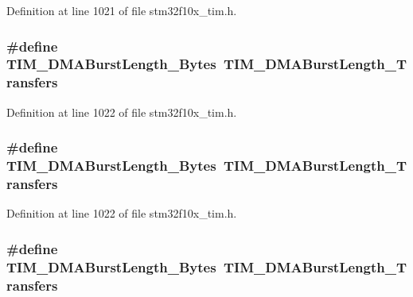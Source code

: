 Definition at line 1021 of file stm32f10x\+\_\+tim.\+h.

\subsubsection[{\texorpdfstring{T\+I\+M\+\_\+\+D\+M\+A\+Burst\+Length\+\_\+3\+Bytes}{TIM_DMABurstLength_3Bytes}}]{\setlength{\rightskip}{0pt plus 5cm}\#define T\+I\+M\+\_\+\+D\+M\+A\+Burst\+Length\+\_\+Bytes~{\bf T\+I\+M\+\_\+\+D\+M\+A\+Burst\+Length\+\_\+Transfers}}\hypertarget{group___t_i_m___legacy_gad06dbc68a994da99b017a18a7197c0ad}{}\label{group___t_i_m___legacy_gad06dbc68a994da99b017a18a7197c0ad}


Definition at line 1022 of file stm32f10x\+\_\+tim.\+h.

\subsubsection[{\texorpdfstring{T\+I\+M\+\_\+\+D\+M\+A\+Burst\+Length\+\_\+3\+Bytes}{TIM_DMABurstLength_3Bytes}}]{\setlength{\rightskip}{0pt plus 5cm}\#define T\+I\+M\+\_\+\+D\+M\+A\+Burst\+Length\+\_\+Bytes~{\bf T\+I\+M\+\_\+\+D\+M\+A\+Burst\+Length\+\_\+Transfers}}\hypertarget{group___t_i_m___legacy_gad06dbc68a994da99b017a18a7197c0ad}{}\label{group___t_i_m___legacy_gad06dbc68a994da99b017a18a7197c0ad}


Definition at line 1022 of file stm32f10x\+\_\+tim.\+h.

\subsubsection[{\texorpdfstring{T\+I\+M\+\_\+\+D\+M\+A\+Burst\+Length\+\_\+4\+Bytes}{TIM_DMABurstLength_4Bytes}}]{\setlength{\rightskip}{0pt plus 5cm}\#define T\+I\+M\+\_\+\+D\+M\+A\+Burst\+Length\+\_\+Bytes~{\bf T\+I\+M\+\_\+\+D\+M\+A\+Burst\+Length\+\_\+Transfers}}\hypertarget{group___t_i_m___legacy_ga620ce560a1d7a6d6769cacd2a2ead48d}{}\label{group___t_i_m___legacy_ga620ce560a1d7a6d6769cacd2a2ead48d}


